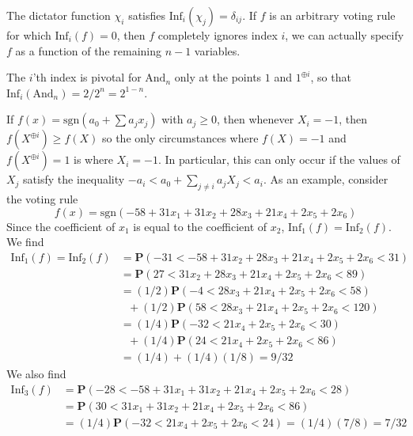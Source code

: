 \begin{example}
    The dictator function $\chi_i$ satisfies $\text{Inf}_i(\chi_j) = \delta_{ij}$. If $f$ is an arbitrary voting rule for which $\text{Inf}_i(f) = 0$, then $f$ completely ignores index $i$, we can actually specify $f$ as a function of the remaining $n-1$ variables.
\end{example}

\begin{example}
    The $i$'th index is pivotal for $\text{And}_n$ only at the points $1$ and $1^{\oplus i}$, so that $\text{Inf}_i(\text{And}_n) = 2/2^n = 2^{1-n}$.
\end{example}

\begin{example}
    If $f(x) = \text{sgn}(a_0 + \sum a_j x_j)$ with $a_j \geq 0$, then whenever $X_i = -1$, then $f(X^{\oplus i}) \geq f(X)$ so the only circumstances where $f(X) = -1$ and $f(X^{\oplus i}) = 1$ is where $X_i = -1$. In particular, this can only occur if the values of $X_j$ satisfy the inequality $-a_i < a_0 + \sum_{j \neq i} a_j X_j < a_i$. As an example, consider the voting rule
    \[ f(x) = \text{sgn}(-58 + 31x_1 + 31x_2 + 28x_3 + 21x_4 + 2x_5 + 2x_6) \]
    Since the coefficient of $x_1$ is equal to the coefficient of $x_2$, $\text{Inf}_1(f) = \text{Inf}_2(f)$. We find
    \begin{align*}
        \text{Inf}_1(f) = \text{Inf}_2(f) &= \mathbf{P}(-31 < -58 + 31x_2 + 28x_3 + 21x_4 + 2x_5 + 2x_6 < 31)\\
        &= \mathbf{P}(27 < 31x_2 + 28x_3 + 21x_4 + 2x_5 + 2x_6 < 89)\\
        &= (1/2) \mathbf{P}(-4 < 28x_3 + 21x_4 + 2x_5 + 2x_6 < 58)\\
        &\ \ \ + (1/2) \mathbf{P}(58 < 28x_3 + 21x_4 + 2x_5 + 2x_6 < 120)\\
        &= (1/4) \mathbf{P}(-32 < 21x_4 + 2x_5 + 2x_6 < 30)\\
        &\ \ \ + (1/4) \mathbf{P}(24 < 21x_4 + 2x_5 + 2x_6 < 86)\\
        &= (1/4) + (1/4)(1/8) = 9/32
    \end{align*}
    We also find
    \begin{align*}
        \text{Inf}_3(f) &= \mathbf{P}(-28 < -58 + 31x_1 + 31x_2 + 21x_4 + 2x_5 + 2x_6 < 28)\\
        &= \mathbf{P}(30 < 31x_1 + 31x_2 + 21x_4 + 2x_5 + 2x_6 < 86)\\
        &= (1/4)\mathbf{P}(-32 < 21x_4 + 2x_5 + 2x_6 < 24) = (1/4)(7/8) = 7/32

\end{align*}
\end{example}
